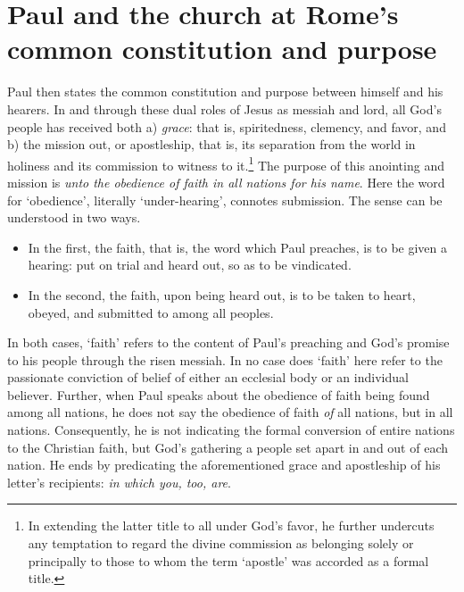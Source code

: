 \section{Paul and the church at Rome's common constitution and purpose}
Paul then states the common constitution and purpose between himself and his hearers. In and through these dual roles of Jesus as messiah and lord, all God's people has received both a) \emph{grace}: that is, spiritedness, clemency, and favor, and b) the mission out, or apostleship, that is, its separation from the world in holiness and its commission to witness to it.\footnote{In extending the latter title to all under God's favor, he further undercuts any temptation to regard the divine commission as belonging solely or principally to those to whom the term `apostle' was accorded as a formal title.} The purpose of this anointing and mission is \emph{unto the obedience of faith in all nations for his name}. Here the word for `obedience', literally `under-hearing', connotes submission. The sense can be understood in two ways. 
\begin{itemize}
	\item In the first, the faith, that is, the word which Paul preaches, is to be given a hearing: put on trial and heard out, so as to be vindicated.
	\item In the second, the faith, upon being heard out, is to be taken to heart, obeyed, and submitted to among all peoples.
\end{itemize}

In both cases, `faith' refers to the content of Paul's preaching and God's promise to his people through the risen messiah. In no case does `faith' here refer to the passionate conviction of belief of either an ecclesial body or an individual believer. Further, when Paul speaks about the obedience of faith being found among all nations, he does not say the obedience of faith \emph{of} all nations, but {in} all nations. Consequently, he is not indicating the formal conversion of entire nations to the Christian faith, but God's gathering a people set apart in and out of each nation. He ends by predicating the aforementioned grace and apostleship of his letter's recipients: \emph{in which you, too, are}.

